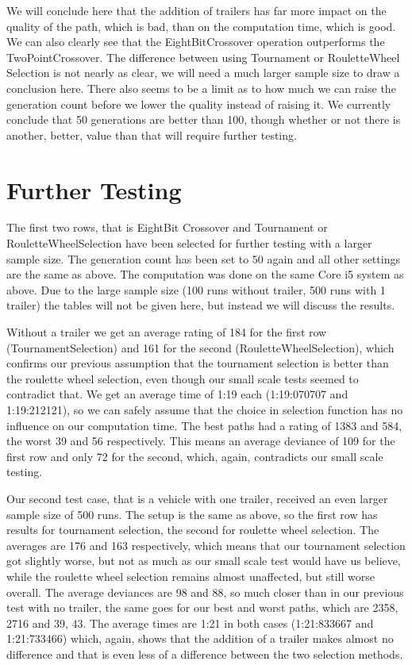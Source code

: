 We will conclude here that the addition of trailers has far more impact on the quality of the path, which is bad, than on the computation time, which is good. We can also clearly see that the EightBitCrossover operation outperforms the TwoPointCrossover. The difference between using Tournament or RouletteWheel Selection is not nearly as clear, we will need a much larger sample size to draw a conclusion here. 
There also seems to be a limit as to how much we can raise the generation count before we lower the quality instead of raising it. We currently conclude that 50 generations are better than 100, though whether or not there is another, better, value than that will require further testing.

\section{Further Testing}
\label{sec:further_testing}

The first two rows, that is EightBit Crossover and Tournament or RouletteWheelSelection have been selected for further testing with a larger sample size. The generation count has been set to 50 again and all other settings are the same as above. The computation was done on the same Core i5 system as above. Due to the large sample size (100 runs without trailer, 500 runs with 1 trailer) the tables will not be given here, but instead we will discuss the results.

Without a trailer we get an average rating of 184 for the first row (TournamentSelection) and 161 for the second (RouletteWheelSelection), which confirms our previous assumption that the tournament selection is better than the roulette wheel selection, even though our small scale tests seemed to contradict that. We get an average time of 1:19 each (1:19:070707 and 1:19:212121), so we can safely assume that the choice in selection function has no influence on our computation time. The best paths had a rating of 1383 and 584, the worst 39 and 56 respectively. This means an average deviance of 109 for the first row and only 72 for the second, which, again, contradicts our small scale testing.

Our second test case, that is a vehicle with one trailer, received an even larger sample size of 500 runs. The setup is the same as above, so the first row has results for tournament selection, the second for roulette wheel selection. The averages are 176 and 163 respectively, which means that our tournament selection got slightly worse, but not as much as our small scale test would have us believe, while the roulette wheel selection remains almost unaffected, but still worse overall. The average deviances are 98 and 88, so much closer than in our previous test with no trailer, the same goes for our best and worst paths, which are 2358, 2716 and 39, 43. The average times are 1:21 in both cases (1:21:833667 and 1:21:733466) which, again, shows that the addition of a trailer makes almost no difference and that is even less of a difference between the two selection methods.